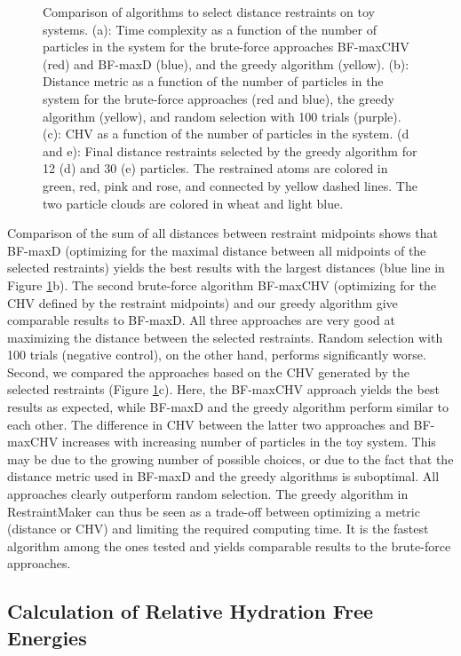 \begin{figure}[h!]
\begin{subfigure}{0.45\columnwidth}
    \end{subfigure}
    \caption{Comparison of algorithms to select distance restraints on toy systems. (a): Time complexity as a function of the number of particles in the system for the brute-force approaches BF-maxCHV (red) and BF-maxD (blue), and the greedy algorithm (yellow). (b): Distance metric as a function of the number of particles in the system for the brute-force approaches (red and blue), the greedy algorithm (yellow), and random selection with 100 trials (purple). (c): CHV as a function of the number of particles in the system. (d and e): Final distance restraints selected by the greedy algorithm for 12 (d) and 30 (e) particles. The restrained atoms are colored in green, red, pink and rose, and connected by yellow dashed lines. The two particle clouds are colored in wheat and light blue.}
    \label{fig: ToyModels}
\end{figure}

Comparison of the sum of all distances between restraint midpoints shows that BF-maxD (optimizing for the maximal distance between all midpoints of the selected restraints) yields the best results with the largest distances (blue line in Figure \ref{fig: ToyModels}b). The second brute-force algorithm BF-maxCHV (optimizing for the CHV defined by the restraint midpoints) and our greedy algorithm give comparable results to BF-maxD. All three approaches are very good at maximizing the distance between the selected restraints. Random selection with 100 trials (negative control), on the other hand, performs significantly worse.
Second, we compared the approaches based on the CHV generated by the selected restraints (Figure \ref{fig: ToyModels}c). Here, the BF-maxCHV approach yields the best results as expected, while BF-maxD and the greedy algorithm perform similar to each other. The difference in CHV between the latter two approaches and BF-maxCHV increases with increasing number of particles in the toy system. This may be due to the growing number of possible choices, or due to the fact that the distance metric used in BF-maxD and the greedy algorithms is suboptimal. All approaches clearly outperform random selection.
%
The greedy algorithm in RestraintMaker can thus be seen as a trade-off between optimizing a metric (distance or CHV) and limiting the required computing time. It is the fastest algorithm among the ones tested and yields comparable results to the brute-force approaches. 

\subsection{Calculation of Relative Hydration Free Energies}
